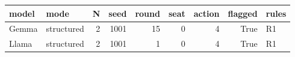\begin{tabular}{llrrrrrrl}
\toprule
model & mode & N & seed & round & seat & action & flagged & rules \\
\midrule
Gemma & structured & 2 & 1001 & 15 & 0 & 4 & True & R1 \\
Llama & structured & 2 & 1001 & 1 & 0 & 4 & True & R1 \\
\bottomrule
\end{tabular}
